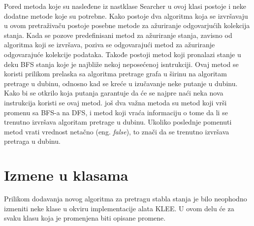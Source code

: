 \documentclass[12pt,oneside]{memoir}
\begin{document}
Pored metoda koje su nasleđene iz nastklase Searcher u ovoj klasi postoje i neke dodatne metode koje su potrebne. Kako postoje dva algoritma koja se izvršavaju u ovom pretraživaču postoje posebne metode za ažuriranje odgovarjućih kolekcija stanja. Kada se pozove predefinisani metod za ažuriranje stanja, zavisno od algoritma koji se izvršava, poziva se odgovarajući metod za ažuriranje odgovarajuće kolekcije podataka. Takođe postoji metod koji pronalazi stanje u deku BFS stanja koje je najbliže nekoj neposećenoj isntrukciji. Ovaj metod se koristi prilikom prelaska sa algoritma pretrage grafa u širinu na algoritam pretrage u dubinu, odnosno kad se kreće u izučavanje neke putanje u dubinu. Kako bi se otkrilo koja putanja garantuje da će se najpre naći neka nova instrukcija koristi se ovaj metod. još dva važna metoda su metod koji vrši promenu sa BFS-a na DFS, i metod koji vraća informaciju o tome da li se trenutno izvršava algoritam pretrage u dubinu. Ukoliko poslednje pomenuti metod vrati vrednost netačno (eng. \textit{false}), to znači da se trenutno izvršava pretraga u dubinu.

\section{Izmene u klasama}
Prilikom dodavanja novog algoritma za pretragu stabla stanja je bilo neophodno izmeniti neke klase u okviru implementacije alata KLEE. U ovom delu će za svaku klasu koja je promenjena biti opisane promene.
\end{document}
